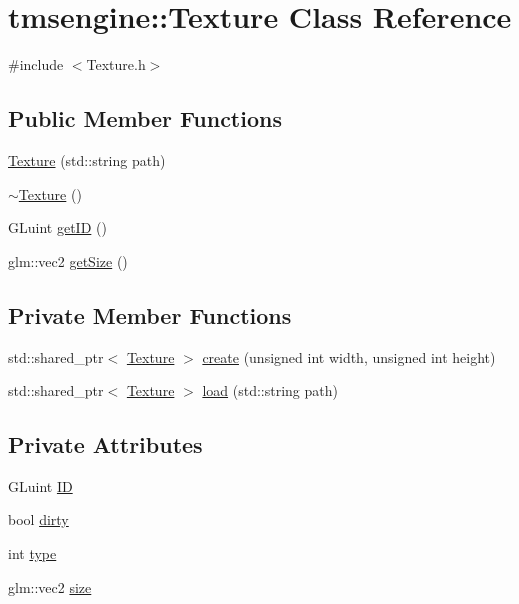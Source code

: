 \hypertarget{classtmsengine_1_1_texture}{}\section{tmsengine\+:\+:Texture Class Reference}
\label{classtmsengine_1_1_texture}


{\ttfamily \#include $<$Texture.\+h$>$}

\subsection*{Public Member Functions}
\begin{DoxyCompactItemize}
\item 
\hyperlink{classtmsengine_1_1_texture_a73f0e6bf5515ee744e3b04ff1899297f}{Texture} (std\+::string path)
\item 
\hyperlink{classtmsengine_1_1_texture_a3985bc791d34dd2c9f3aad02b8095a97}{$\sim$\+Texture} ()
\item 
G\+Luint \hyperlink{classtmsengine_1_1_texture_ab0328c347b63d7b7291c24aa59f2168c}{get\+ID} ()
\item 
glm\+::vec2 \hyperlink{classtmsengine_1_1_texture_a4a1851f9fca94e2fe5c1cc4d723167d1}{get\+Size} ()
\end{DoxyCompactItemize}
\subsection*{Private Member Functions}
\begin{DoxyCompactItemize}
\item 
std\+::shared\+\_\+ptr$<$ \hyperlink{classtmsengine_1_1_texture}{Texture} $>$ \hyperlink{classtmsengine_1_1_texture_a34e2d3a96afc3f1882f32b7ed93497c0}{create} (unsigned int width, unsigned int height)
\item 
std\+::shared\+\_\+ptr$<$ \hyperlink{classtmsengine_1_1_texture}{Texture} $>$ \hyperlink{classtmsengine_1_1_texture_aebb7c646b34ce4ef328194a8948b1753}{load} (std\+::string path)
\end{DoxyCompactItemize}
\subsection*{Private Attributes}
\begin{DoxyCompactItemize}
\item 
G\+Luint \hyperlink{classtmsengine_1_1_texture_a4dfe526efa0addb02849a4f88a9b299a}{ID}
\item 
bool \hyperlink{classtmsengine_1_1_texture_af638b68fbf939afa705fb1d4b788a98d}{dirty}
\item 
int \hyperlink{classtmsengine_1_1_texture_a611e350120e816da2bfc77fca2a5a7e7}{type}
\item 
glm\+::vec2 \hyperlink{classtmsengine_1_1_texture_a2de0e5f3fe721ae3f7dc6b27ea03d752}{size}
\end{DoxyCompactItemize}


